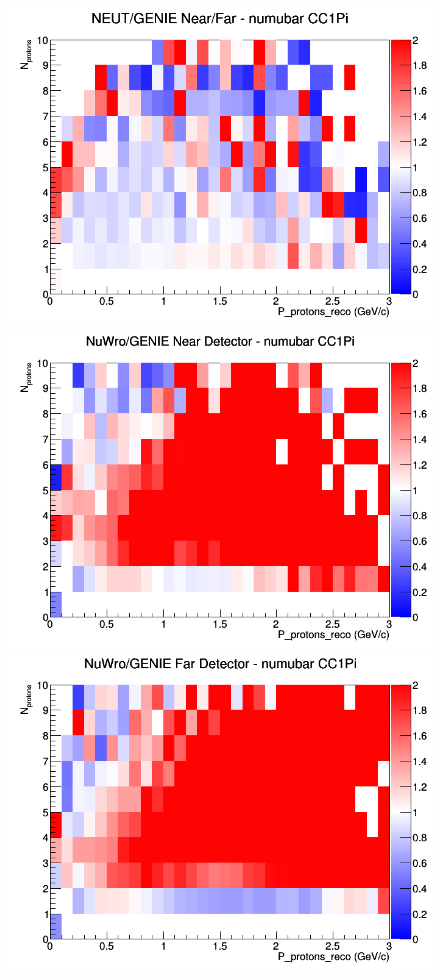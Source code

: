\begin{figure}[h]
\endminipage
{}
\includegraphics[width=\linewidth]{eff_N_P/LAr/protons/ratios/CC1Pi_NEUT_GENIE_numubar_NF_N_P.png}
\endminipage
\newline
{}
\includegraphics[width=\linewidth]{eff_N_P/LAr/protons/ratios/CC1Pi_NuWro_GENIE_numubar_near_N_P.png}
\endminipage
{}
\includegraphics[width=\linewidth]{eff_N_P/LAr/protons/ratios/CC1Pi_NuWro_GENIE_numubar_far_N_P.png}

\end{figure}
